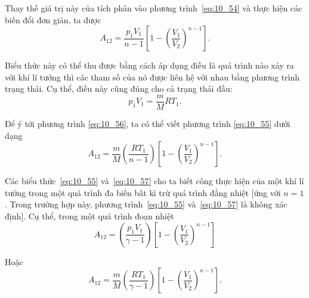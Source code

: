 Thay thế giá trị này của tích phân vào phương trình~\eqref{eq:10_54} và thực hiện các biến đổi đơn giản, ta được 
\begin{equation}\label{eq:10_55}
	A_{12} = \frac{p_1 V_1}{n-1} \left[1 - \left(\frac{V_1}{V_2}\right)^{n-1} \right].
\end{equation}


Biểu thức này có thể thu được bằng cách áp dụng điều là quá trình nào xảy ra với khí lí tưởng thì các tham số của nó được liên hệ với nhau bằng phương trình trạng thái. Cụ thể, điều này cũng đúng cho cả trạng thái đầu:
\begin{equation}\label{eq:10_56}
	p_1 V_1 = \frac{m}{M}RT_1.
\end{equation}

\noindent

Để ý tới phương trình \eqref{eq:10_56}, ta có thể viết phương trình \eqref{eq:10_55} dưới dạng
\begin{equation}\label{eq:10_57}
	A_{12} = \frac{m}{M} \left(\frac{RT_1}{n-1}\right) \left[1 - \left(\frac{V_1}{V_2}\right)^{n-1} \right].
\end{equation}


Các biểu thức~\eqref{eq:10_55} và~\eqref{eq:10_57} cho ta biết công thực hiện của một khí lí tưởng trong một quá trình đa biến bất kì trừ quá trình đẳng nhiệt [ứng với $n=1$. Trong trường hợp này, phương trình~\eqref{eq:10_55} và~\eqref{eq:10_57} là không xác định]. Cụ thể, trong một quá trình đoạn nhiệt 
\begin{equation}\label{eq:10_58}
	A_{12} = \left(\frac{p_1 V_1}{\gamma - 1}\right) \left[1 - \left(\frac{V_1}{V_2}\right)^{n-1} \right]
\end{equation}

\noindent

Hoặc
\begin{equation}\label{eq:10_59}
	A_{12} = \frac{m}{M} \left(\frac{RT_1}{\gamma - 1}\right) \left[1 - \left(\frac{V_1}{V_2}\right)^{n-1} \right].
\end{equation}

